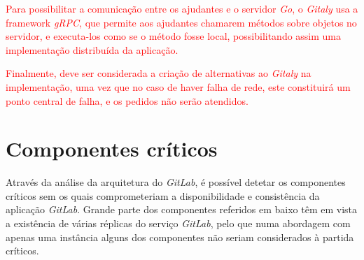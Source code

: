 \documentclass[12pt,a4paper]{article}
\begin{document}
\textcolor{red}{Para possibilitar a comunicação entre os ajudantes e o servidor \textit{Go}, o \textit{Gitaly} usa a framework \textit{gRPC}, que permite aos ajudantes chamarem métodos sobre objetos no servidor, e executa-los como se o método fosse local, possibilitando assim uma implementação distribuída da aplicação.}

\textcolor{red}{Finalmente, deve ser considerada a criação de alternativas ao \textit{Gitaly} na implementação, uma vez que no caso de haver falha de rede, este constituirá um ponto central de falha, e os pedidos não serão atendidos.}





\newpage
\section{Componentes críticos}

Através da análise da arquitetura do \emph{GitLab}, é possível detetar os componentes críticos sem os quais comprometeriam a disponibilidade e consistência da aplicação \emph{GitLab}. Grande parte dos componentes referidos em baixo têm em vista a existência de várias réplicas do serviço \emph{GitLab}, pelo que numa abordagem com apenas uma instância alguns dos componentes não seriam considerados à partida críticos.
\end{document}
